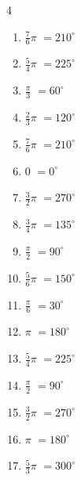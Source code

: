 \begin{multicols}{4}
\begin{enumerate}
  \item $\displaystyle \frac{7}{6}\pi$
        $\displaystyle =210^{\circ}$

  \item $\displaystyle \frac{5}{4}\pi$
        $\displaystyle =225^{\circ}$

  \item $\displaystyle \frac{\pi}{3}$
        $\displaystyle =60^{\circ}$

  \item $\displaystyle \frac{2}{3}\pi$
        $\displaystyle =120^{\circ}$

  \item $\displaystyle \frac{7}{6}\pi$
        $\displaystyle =210^{\circ}$

  \item $\displaystyle 0$
        $\displaystyle =0^{\circ}$

  \item $\displaystyle \frac{3}{2}\pi$
        $\displaystyle =270^{\circ}$

  \item $\displaystyle \frac{3}{4}\pi$
        $\displaystyle =135^{\circ}$

  \item $\displaystyle \frac{\pi}{2}$
        $\displaystyle =90^{\circ}$

  \item $\displaystyle \frac{5}{6}\pi$
        $\displaystyle =150^{\circ}$

  \item $\displaystyle \frac{\pi}{6}$
        $\displaystyle =30^{\circ}$

  \item $\displaystyle \pi$
        $\displaystyle =180^{\circ}$

  \item $\displaystyle \frac{5}{4}\pi$
        $\displaystyle =225^{\circ}$

  \item $\displaystyle \frac{\pi}{2}$
        $\displaystyle =90^{\circ}$

  \item $\displaystyle \frac{3}{2}\pi$
        $\displaystyle =270^{\circ}$

  \item $\displaystyle \pi$
        $\displaystyle =180^{\circ}$

  \item $\displaystyle \frac{5}{3}\pi$
        $\displaystyle =300^{\circ}$


\end{enumerate}
\end{multicols}
